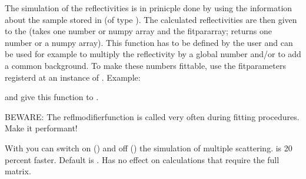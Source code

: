 \documentclass[letterpaper,10pt,english]{sphinxmanual}
\begin{document}
\begin{fulllineitems}
\begin{fulllineitems}
The simulation of the reflectivities is in prinicple done by using the information about the sample stored in  (of type {\hyperref[\detokenize{modules-api/samplerepresentation:SampleRepresentation.Heterostructure}]{}}).
The calculated reflectivities are then given to the  (takes one number or numpy array and the fitpararray; returns one number or a numpy array). This function has to be defined
by the user and can be used for example to multiply the reflectivity by a global number and/or to add a common background. To make these numbers fittable, use the fitparameters registerd at an instance of .
Example:

%
\begin{sphinxVerbatim}[commandchars=\\\{\}]
       
\end{sphinxVerbatim}

and give this function to {\hyperref[\detokenize{modules-api/experiment:Experiment.ReflDataSimulator.setModel}]{}}.

BEWARE: The reflmodifierfunction is called very often during fitting procedures. Make it performant!

With  you can switch on () and off () the simulation of multiple scattering.  is 20 percent faster. Default is . Has no effect on calculations that require the full matrix.


\end{fulllineitems}
\end{fulllineitems}
\end{document}
